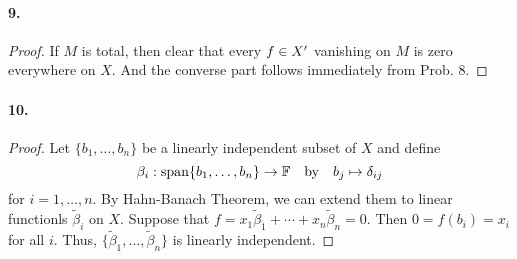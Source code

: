   \paragraph{9.}
  \begin{proof}
    If $M$ is total, then clear that every $f\in X^\prime$ vanishing on $M$ is zero
    everywhere on $X$. And the converse part follows immediately from Prob. 8.
  \end{proof}
  
  \paragraph{10.}
  \begin{proof}
    Let $\{b_1,\dots,b_n\}$ be a linearly independent subset of $X$ and define
    \[
      \beta_i:\operatorname{span}\{b_1,\dots,b_n\}\to\mathbb{F} 
      \quad\text{by}\quad
      b_j\mapsto\delta_{ij}
    \]
    for $i=1,\dots,n$. By Hahn-Banach Theorem, we can extend them to linear 
    functionls $\tilde{\beta}_i$ on $X$. Suppose that $f=x_1\tilde{\beta}_1+
    \cdots+x_n\tilde{\beta}_n=0$. Then $0=f(b_i)=x_i$ for all $i$. Thus, $\{
    \tilde{\beta}_1,\dots,\tilde{\beta}_n\}$ is linearly independent.
  \end{proof}














